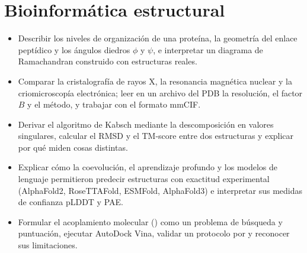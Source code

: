 \chapter{Bioinformática estructural}\label{cap:15}



\begin{objetivos}
\begin{itemize}
  \item Describir los niveles de organización de una proteína, la geometría del enlace peptídico y los ángulos diedros $\phi$ y $\psi$, e interpretar un diagrama de Ramachandran construido con estructuras reales.
  \item Comparar la cristalografía de rayos X, la resonancia magnética nuclear y la criomicroscopía electrónica; leer en un archivo del PDB la resolución, el factor $B$ y el método, y trabajar con el formato mmCIF.
  \item Derivar el algoritmo de Kabsch mediante la descomposición en valores singulares, calcular el RMSD y el TM-score entre dos estructuras y explicar por qué miden cosas distintas.
  \item Explicar cómo la coevolución, el aprendizaje profundo y los modelos de lenguaje permitieron predecir estructuras con exactitud experimental (AlphaFold2, RoseTTAFold, ESMFold, AlphaFold3) e interpretar sus medidas de confianza pLDDT y PAE.
  \item Formular el acoplamiento molecular () como un problema de búsqueda y puntuación, ejecutar AutoDock Vina, validar un protocolo por  y reconocer sus limitaciones.
\end{itemize}
\end{objetivos}


